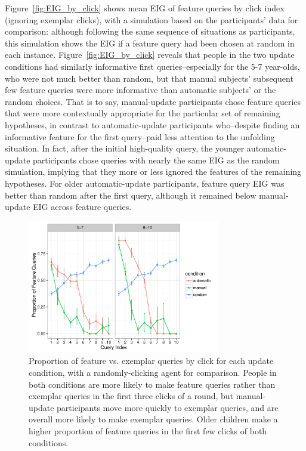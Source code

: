 \documentclass[man,floatsintext]{apa6}
\begin{document}
Figure~\ref{fig:EIG_by_click} shows mean EIG of feature queries by click index (ignoring exemplar clicks), with a simulation based on the participants' data for comparison: although following the same sequence of situations as participants, this simulation shows the EIG if a feature query had been chosen at random in each instance. 
Figure~\ref{fig:EIG_by_click} reveals that people in the two update conditions had similarly informative first queries--especially for the 5-7 year-olds, who were not much better than random, but that manual subjects' subsequent few feature queries were more informative than automatic subjects' or the random choices. That is to say, manual-update participants chose feature queries that were more contextually appropriate for the particular set of remaining hypotheses, in contrast to automatic-update participants who--despite finding an informative feature for the first query--paid less attention to the unfolding situation. In fact, after the initial high-quality query, the younger automatic-update participants chose queries with nearly the same EIG as the random simulation, implying that they more or less ignored the features of the remaining hypotheses. For older automatic-update participants, feature query EIG was better than random after the first query, although it remained below manual-update EIG across feature queries.

\begin{figure}[!h]
  \centering
  \includegraphics[width=0.75\textwidth]{figures/proportion_feat_queries_by_click} %
  \vspace{-.1cm}
  \caption{Proportion of feature vs. exemplar queries by click for each update condition, with a randomly-clicking agent for comparison. People in both conditions are more likely to make feature queries rather than 
exemplar queries in the first three clicks of a round, but manual-update participants 
move more quickly to exemplar queries, and are overall more likely to make 
exemplar queries. Older children make a higher proportion of feature queries in the first few clicks of both conditions.}
  \label{fig:query-prop-click}
  \vspace{-.1cm}
\end{figure} 
\end{document}
